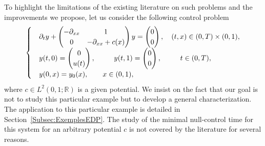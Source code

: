 \documentclass[10pt]{amsart}
\theoremstyle{definition}\newtheorem{defi}[theo]{Definition}\newtheorem{rema}[theo]{Remark}\newtheorem{exam}[theo]{Example}\newtheorem{exem}[theo]{Example}\newtheorem{nota}[theo]{Notation}
\newcommand{\R}{\mathbb{R}}
\begin{document}
To highlight the limitations of the existing literature on such problems and the improvements we propose, let us consider the following control problem
\begin{equation*}
\begin{cases}
& \partial_t y +
\begin{pmatrix} - \partial_{xx} & 1 \\ 0 & -\partial_{xx} + c(x)
\end{pmatrix} y =
\begin{pmatrix} 0 \\ 0
\end{pmatrix},
\quad (t,x) \in (0,T) \times (0,1),
\\
&y(t,0) =
\begin{pmatrix}
0 \\ u(t)
\end{pmatrix}, \mkern47mu y(t,1) =
\begin{pmatrix}
0 \\ 0
\end{pmatrix}, \quad \mkern 29mu t\in (0,T),
\\
&y(0,x) = y_0(x), \qquad x \in (0,1),
\end{cases}
\end{equation*}
where $c\in L^2(0,1;\R)$ is a given potential. We insist on the fact that our goal is not to study this particular example but to develop a general characterization. The application to this particular example is detailed in Section~\ref{Subsec:ExemplesEDP}. The study of the minimal null-control time for this system for an arbitrary potential $c$ is not covered by the literature for several reasons.
\end{document}

